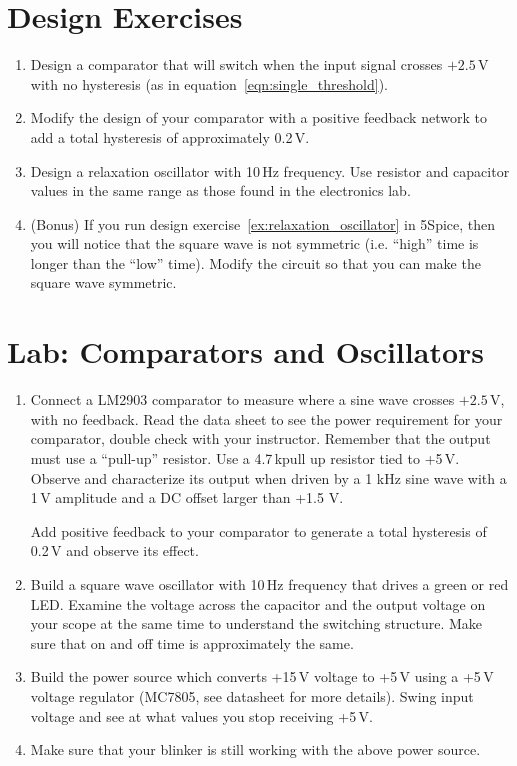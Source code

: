 \documentclass{article}
\begin{document}
\pagebreak

\section{Design Exercises}

\begin{enumerate}
\item Design a comparator that will switch when the input signal crosses $+2.5$\,V with no hysteresis (as in equation~\ref{eqn:single_threshold}).
 
\item Modify the design of your comparator with a positive feedback network to add a total hysteresis of approximately 0.2\,V.

\item \label{ex:relaxation_oscillator} Design a relaxation oscillator with 10\,Hz frequency. Use resistor and capacitor values in the same range as those found in the electronics lab.

\item (Bonus) If you run design exercise~\ref{ex:relaxation_oscillator} in 5Spice, then you will notice that the square wave is not symmetric (i.e. ``high'' time is longer than the ``low'' time). Modify the circuit so that you can make the square wave symmetric.
\end{enumerate}

\section{Lab: Comparators and Oscillators}

\begin{enumerate}
\item Connect a LM2903 comparator to measure where a sine wave crosses $+2.5$\,V, with no feedback. Read the data sheet to see the power requirement for your comparator, double check with your instructor. Remember that the output must use a ``pull-up'' resistor. Use a 4.7\,k\Ohm pull up resistor tied to +5\,V. Observe and characterize its output when driven by a 1 kHz sine wave with a 1\,V amplitude and a DC offset larger than +1.5 V.

Add positive feedback to your comparator to generate a total hysteresis of 0.2\,V and observe its effect.

\item Build a square wave oscillator with 10\,Hz frequency that drives a green or red LED.  Examine the voltage across the capacitor and the output voltage on your scope at the same time to understand the switching structure. Make sure that on and off time is approximately the same.

\item Build the power source which converts +15\,V voltage to +5\,V using a +5\,V voltage regulator (MC7805, see datasheet for more details).  Swing input voltage and see at what values you stop receiving +5\,V. 

\item Make sure that your blinker is still working with the above power source.
\end{enumerate}
\end{document}
